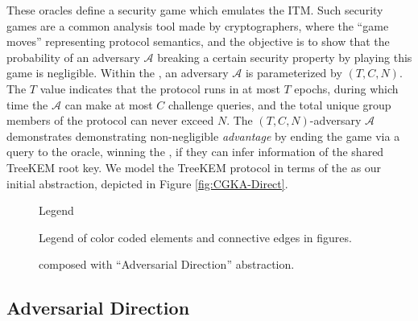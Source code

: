 \documentclass[runningheads]{llncs}
\newcommand{\Abrev}[1]{\gls{#1}}
\newcommand{\Adversary}{\ensuremath{\mathcal{A}}\xspace}
\begin{document}
These oracles define a security game \cite{shoup2004sequences} which emulates the \Abrev{ITM}.
Such security games are a common analysis tool made by cryptographers, where the ``game moves'' representing protocol semantics, and the objective is to show that the probability of an adversary \Adversary  breaking a certain security property by playing this game is negligible.
Within the \CGKAsec, an adversary \Adversary is parameterized by \((T, C, N)\).
The \(T\) value indicates that the protocol runs in at most \(T\) epochs, during which time the \(\mathcal{A}\) can make at most \(C\) challenge queries, and the total unique group members of the protocol can never exceed \(N\).
The \((T, C, N)\)-adversary \(\mathcal{A}\) demonstrates demonstrating non-negligible \emph{advantage} by ending the game via a query to the  oracle, winning the \CGKAsec, if they can infer information of the shared TreeKEM root key.
We model the TreeKEM protocol in terms of the \CGKAsec as our initial abstraction, depicted in Figure \ref{fig:CGKA-Direct}.

\begin{figure}
\centering
{Legend}
\caption{Legend of color coded elements and connective edges in figures.\label{fig:CGKA-Legend}}%
\end{figure}


\begin{figure}
\centering
{}
\caption[Transition graph of informal CGKA definition]{%
\label{fig:CGKA-Direct}%
High-level illustration of the \CGKAsec formalization.\ %
}%
\vfill
{}
\caption[Transition graph of informal CGKA definition]{%
\label{fig:CGKA-Adversarial-Driven}%
\CGKAsec composed with ``Adversarial Direction'' abstraction.%
}%
\end{figure}


\subsection{Adversarial Direction}
\end{document}
